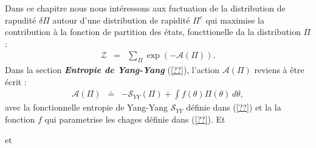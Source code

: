 Dans ce chapitre nous nous intéressons aux fuctuation de la distribution de rapudité $\delta \Pi$ autour d'une distribution de rapidité $\Pi^c$ qui maximise la contribution à la fonction de partition des états, foncttionelle da la distribution $\Pi$ :
\begin{eqnarray*}
	\mathcal{Z} & = & \sum_\Pi \exp \left ( -\mathcal{A}(\Pi) \right ). 
\end{eqnarray*} 
Dans la section {\em \bf Entropie de Yang-Yang} (\ref{??}), l'action $\mathcal{A}(\Pi)$ reviens à être écrit :
\begin{eqnarray*}
	\mathcal{A}(\Pi) & \doteq & - \mathcal{S}_{YY}(\Pi) + \int f(\theta) \Pi (\theta) \, d\theta ,		
\end{eqnarray*}
avec la fonctionnelle entropie de Yang-Yang $\mathcal{S}_{YY}$  définie dans (\ref{??}) et la la fonction $f$ qui parametrise les chages   définie dans (\ref{??}). Et 


et  
 